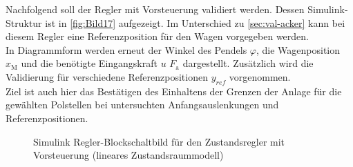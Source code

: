 Nachfolgend soll der Regler mit Vorsteuerung validiert werden. Dessen Simulink-Struktur ist in \autoref{fig:Bild17} aufgezeigt. Im Unterschied zu \autoref{sec:val-acker} kann bei diesem Regler eine Referenzposition für den Wagen vorgegeben werden. \\
In Diagrammform werden erneut der Winkel des Pendels $\varphi$, die Wagenposition $x_{\mathrm{M}}$ und die benötigte Eingangskraft $u$ \bzw $F_{\mathrm{a}}$ dargestellt. Zusätzlich wird die Validierung für verschiedene Referenzpositionen $y_{ref}$ vorgenommen. \\
Ziel ist auch hier das Bestätigen des Einhaltens der Grenzen der Anlage für die gewählten Polstellen bei untersuchten Anfangsauslenkungen und Referenzpositionen. 

\begin{figure}[H]
    \centering
    \caption[Regler mit Vorsteuerung Simulink (linear)]{Simulink Regler-Blockschaltbild für den Zustandsregler mit Vorsteuerung (lineares Zustandsraummodell)}
    \label{fig:Bild17}
\end{figure}

